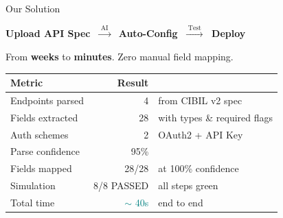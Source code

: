 \documentclass[aspectratio=169,11pt]{beamer}
\begin{document}
\begin{frame}{Our Solution}
\begin{center}
{\Large \textbf{Upload API Spec} $\;\xrightarrow{\;\text{AI}\;}\;$ \textbf{Auto-Config} $\;\xrightarrow{\;\text{Test}\;}\;$ \textbf{Deploy}}
\vspace{0.3em}

{\color{ts} From \textbf{weeks} to \textbf{minutes}. Zero manual field mapping.}
\end{center}

\vspace{0.4em}
\begin{center}
{\small
\begin{tabular}{lrl}
\toprule
\textbf{Metric} & \textbf{Result} & \\
\midrule
Endpoints parsed & \textcolor{ok}{4} & from CIBIL v2 spec \\
Fields extracted & \textcolor{ok}{28} & with types \& required flags \\
Auth schemes & \textcolor{ok}{2} & OAuth2 + API Key \\
Parse confidence & \textcolor{ok}{95\%} & \\
Fields mapped & \textcolor{ok}{28/28} & at 100\% confidence \\
Simulation & \textcolor{ok}{8/8 PASSED} & all steps green \\
Total time & \textcolor{teal}{$\sim$ 40s} & end to end \\
\bottomrule
\end{tabular}
}
\end{center}
\end{frame}
\end{document}
